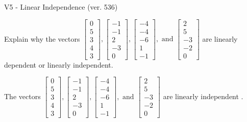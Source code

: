 \begin{exercise}
  \begin{exerciseTitle}V5 - Linear Independence (ver. 536)\end{exerciseTitle}
  \begin{exerciseStatement}
    Explain why the vectors \(\left[\begin{array}{r}
0 \\
5 \\
3 \\
4 \\
3
\end{array}\right] , \left[\begin{array}{r}
-1 \\
-1 \\
2 \\
-3 \\
0
\end{array}\right] , \left[\begin{array}{r}
-4 \\
-4 \\
-6 \\
1 \\
-1
\end{array}\right] , \text{ and } \left[\begin{array}{r}
2 \\
5 \\
-3 \\
-2 \\
0
\end{array}\right]\) are linearly dependent or linearly independent.	


  \end{exerciseStatement}
  \begin{exerciseAnswer}
   The vectors \(\left[\begin{array}{r}
0 \\
5 \\
3 \\
4 \\
3
\end{array}\right] , \left[\begin{array}{r}
-1 \\
-1 \\
2 \\
-3 \\
0
\end{array}\right] , \left[\begin{array}{r}
-4 \\
-4 \\
-6 \\
1 \\
-1
\end{array}\right] , \text{ and } \left[\begin{array}{r}
2 \\
5 \\
-3 \\
-2 \\
0
\end{array}\right]\) are 
  	 linearly independent  .
  


  \end{exerciseAnswer}
\end{exercise}